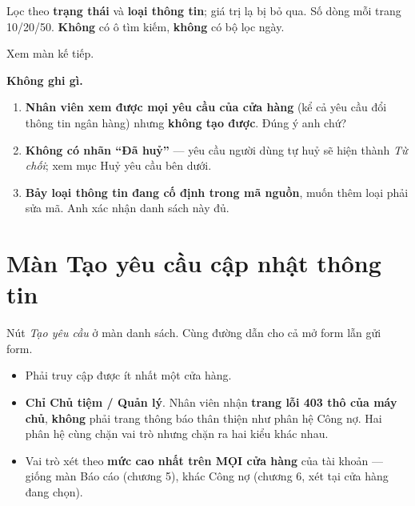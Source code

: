 \mloc

Lọc theo \textbf{trạng thái} và \textbf{loại thông tin}; giá trị lạ bị bỏ qua. Số dòng mỗi
trang 10/20/50. \textbf{Không} có ô tìm kiếm, \textbf{không} có bộ lọc ngày.


Xem màn kế tiếp.

\mghi

\textbf{Không ghi gì.}

\mhoi

\begin{ask}
\begin{enumerate}[leftmargin=*]
  \item \textbf{Nhân viên xem được mọi yêu cầu của cửa hàng} (kể cả yêu cầu đổi thông tin ngân
        hàng) nhưng \textbf{không tạo được}. Đúng ý anh chứ?
  \item \textbf{Không có nhãn ``Đã huỷ''} --- yêu cầu người dùng tự huỷ sẽ hiện thành
        \emph{Từ chối}; xem mục Huỷ yêu cầu bên dưới.
  \item \textbf{Bảy loại thông tin đang cố định trong mã nguồn}, muốn thêm loại phải sửa mã.
        Anh xác nhận danh sách này đủ.
\end{enumerate}
\end{ask}

\section{Màn Tạo yêu cầu cập nhật thông tin}
\medskip

\mvao

Nút \emph{Tạo yêu cầu} ở màn danh sách. Cùng đường dẫn cho cả mở form lẫn gửi form.

\mai

\begin{itemize}[leftmargin=*]
  \item Phải truy cập được ít nhất một cửa hàng.
  \item \textbf{Chỉ Chủ tiệm / Quản lý}. Nhân viên nhận \textbf{trang lỗi 403 thô của máy chủ},
        \textbf{không} phải trang thông báo thân thiện như phân hệ Công nợ. Hai phân hệ cùng
        chặn vai trò nhưng chặn ra hai kiểu khác nhau.
  \item Vai trò xét theo \textbf{mức cao nhất trên MỌI cửa hàng} của tài khoản --- giống màn Báo
        cáo (chương 5), khác Công nợ (chương 6, xét tại cửa hàng đang chọn).
\end{itemize}

